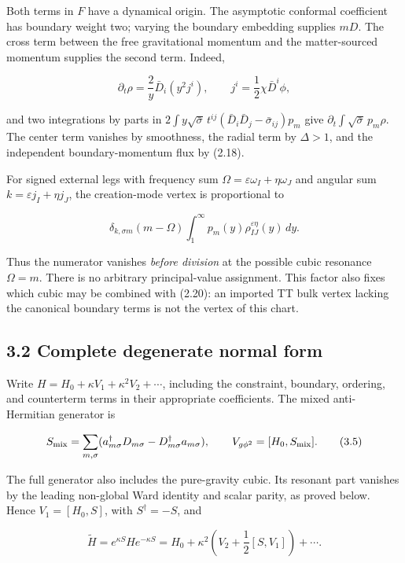 \documentclass[a4paper,11pt]{article}
\numberwithin{equation}{section}
\begin{document}
Both terms in \(F\) have a dynamical origin. The asymptotic conformal coefficient has boundary weight two; varying the boundary embedding supplies \(mD\). The cross term between the free gravitational momentum and the matter-sourced momentum supplies the second term. Indeed,

\[
\partial_t\rho=\frac2y\bar D_i(y^2j^i),
\qquad j^i=\frac12\chi\bar D^i\phi ,
\tag{3.3}
\]

and two integrations by parts in \(2\int y\sqrt{\bar\sigma}\,t^{ij}(\bar D_i\bar D_j-\bar\sigma_{ij})p_m\) give \(\partial_t\int\sqrt{\bar\sigma}\,p_m\rho\). The center term vanishes by smoothness, the radial term by \(\Delta>1\), and the independent boundary-momentum flux by (2.18).

For signed external legs with frequency sum \(\Omega=\varepsilon\omega_I+\eta\omega_J\) and angular sum \(k=\varepsilon j_I+\eta j_J\), the creation-mode vertex is proportional to

\[
\delta_{k,\sigma m}(m-\Omega)
\int_1^\infty p_m(y)\rho_{IJ}^{\varepsilon\eta}(y)\,dy .
\tag{3.4}
\]

Thus the numerator vanishes \emph{before division} at the possible cubic resonance \(\Omega=m\). There is no arbitrary principal-value assignment. This factor also fixes which cubic may be combined with (2.20): an imported TT bulk vertex lacking the canonical boundary terms is not the vertex of this chart.

\hypertarget{complete-degenerate-normal-form}{%
\subsection{3.2 Complete degenerate normal form}\label{complete-degenerate-normal-form}}

Write \(H=H_0+\kappa V_1+\kappa^2V_2+\cdots\), including the constraint, boundary, ordering, and counterterm terms in their appropriate coefficients. The mixed anti-Hermitian generator is

\[
S_{\rm mix}=\sum_{m,\sigma}
(a^\dagger_{m\sigma}D_{m\sigma}
-D^\dagger_{m\sigma}a_{m\sigma}),
\qquad V_{g\phi^2}=[H_0,S_{\rm mix}].
\tag{3.5}
\]

The full generator also includes the pure-gravity cubic. Its resonant part vanishes by the leading non-global Ward identity and scalar parity, as proved below. Hence \(V_1=[H_0,S]\), with \(S^\dagger=-S\), and

\[
\widetilde H=e^{\kappa S}He^{-\kappa S}
=H_0+\kappa^2\left(V_2+\frac12[S,V_1]\right)+\cdots .
\tag{3.6}
\]
\end{document}
